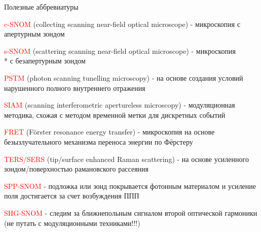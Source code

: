 \documentclass[9pt, compress, xcolor=table]{beamer}
\begin{document}
\begin{frame}{Полезные аббревиатуры}

\colorbox{yellow!30}{\textcolor{red}{c-SNOM} (collecting scanning near-field optical microscope) - микроскопия} \newline \colorbox{yellow!30}{с апертурным зондом}

\colorbox{yellow!30}{\textcolor{red}{s-SNOM} (scattering scanning near-field optical microscope) - микроскопия} \\* \colorbox{yellow!30}{с безапертурным зондом}

\textcolor{red}{PSTM} (photon scanning tunelling microscopy) - на основе создания условий нарушенного полного внутреннего отражения 

\textcolor{red}{SIAM} (scanning interferometric apertureless microscopy) - модуляционная методика, схожая с методом временной метки для дискретных событий

\textcolor{red}{FRET} (F\"orster resonance energy transfer) - микроскопия на основе безызлучательного механизма переноса энергии по Фёрстеру

\textcolor{red}{TERS/SERS} (tip/surface enhanced Raman scattering)
- на основе усиленного зондом/поверхностью рамановского рассеяния

\textcolor{red}{SPP-SNOM} - подложка или зонд покрывается фотонным материалом и усиление поля достигается за счет возбуждения ППП

\textcolor{red}{SHG-SNOM} - следим за ближнепольным сигналом второй оптической гармоники (не путать с модуляционными техниками!!!)


\end{frame}

\end{document}
